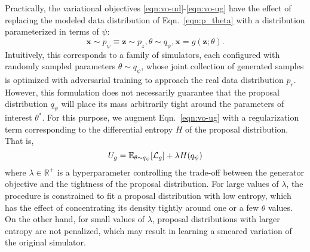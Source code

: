 \documentclass[twocolumn,superscriptaddress,aps]{revtex4-1}
\newcommand{\glnote}[1]{\textcolor{red}{[GL: #1]}}
\theoremstyle{plain}
\begin{document}
Practically, the variational objectives \ref{eqn:vo-ud}-\ref{eqn:vo-ug}
have the effect of replacing the modeled data distribution of Eqn.~\ref{eqn:p_theta} with
a distribution parameterized in terms of $\psi$:
\begin{equation}\label{eqn:p_psi}
    \mathbf{x} \sim p_\psi \equiv \mathbf{z} \sim p_z, \theta \sim q_\psi, \mathbf{x} = g(\mathbf{z}; \theta).
\end{equation}
Intuitively, this corresponds to a family of simulators, each configured
with randomly sampled parameters $\theta \sim q_\psi$, whose joint collection
of generated samples is optimized with adversarial training to approach the real data distribution $p_r$.
However, this formulation does not necessarily guarantee that the
proposal distribution $q_\psi$ will place its mass arbitrarily tight
around the parameters of interest $\theta^*$. For this purpose, we augment Eqn.~\ref{eqn:vo-ug}
with a regularization term corresponding to the differential entropy $H$ of
the proposal distribution. That is,
\begin{equation}
    U_g = \mathbb{E}_{\theta \sim q_\psi} [ {\cal L}_g ] + \lambda H(q_\psi)
\end{equation}
where $\lambda \in \mathbb{R}^+$ is a hyperparameter controlling the trade-off
between the generator objective and the tightness of the proposal distribution.
For large values of $\lambda$, the procedure is constrained to fit a proposal
distribution with low entropy, which has the effect of concentrating its density
tightly around one or a few $\theta$ values. On the other hand, for small values of $\lambda$,
proposal distributions with larger entropy are not penalized, which may result
in learning a smeared variation of the original simulator.



\end{document}
